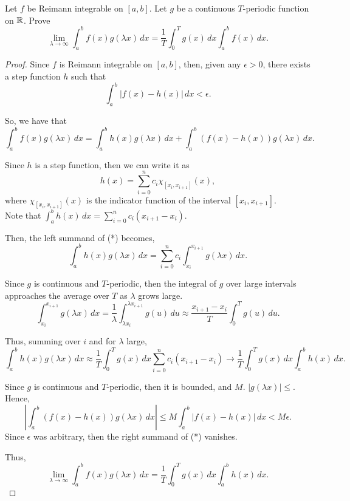 \documentclass[../hw5]{subfiles}
\begin{document}
\begin{problem}
Let $f$ be Reimann integrable on  $[a,b]$.
Let $g$ be a continuous  $T$-periodic function on  $\mathbb{R}$.
Prove \[
	\lim_{\lambda \to \infty} \int_{a}^{b} f(x)g(\lambda x) \,dx = \frac{1}{T}\int_{0}^{T}g(x)\,dx \int_{a}^{b} f(x) \,dx
	.\]
\end{problem}
\begin{proof}
	Since $f$ is Reimann integrable on $[a,b]$, then, given any  $\epsilon>0$, there exists a step function $h$ such that \[
		\int_{a}^{b} |f(x)-h(x)| \,dx < \epsilon
		.\]

	So, we have that \[
		\int_{a}^{b} f(x)g(\lambda x) \,dx = \int_{a}^{b} h(x)g(\lambda x) \,dx + \int_{a}^{b} (f(x)-h(x))g(\lambda x) \,dx \tag{*}
		.\]

	Since $h$ is a step function, then we can write it as \[
		h(x)=\sum_{i=0}^{n} c_i \chi_{[x_i,x_{i+1}]}(x)
		,\] where $ \chi_{[x_i,x_{i+1}]}(x)$ is the indicator function of the interval $[x_i,x_{i+1}]$.\\
	Note that $\int_{a}^{b} h(x) \,dx = \sum_{i=0}^{n} c_i (x_{i+1}-x_i)$.

	Then, the left summand of (*) becomes, \[
		\int_{a}^{b} h(x)g(\lambda x) \,dx = \sum_{i=0 }^{n} c_i \int_{x_i }^{x_{i+1}}g(\lambda x) \,dx
		.\]

	Since $g$ is continuous and $T$-periodic, then the integral of $g$ over large intervals approaches the average over $T$ as $\lambda$ grows large.
	\[
		\int_{x_i}^{x_{i+1}} g(\lambda x) \,dx
		= \frac{1}{\lambda}\int_{\lambda x_i}^{\lambda x_{i+1}} g(u) \,du
		\approx \frac{x_{i+1}-x_i}{T}\int_{0}^{T} g(u) \,du
		.\]

	Thus, summing over $i$ and for $\lambda$ large, \[
		\int_{a}^{b} h(x)g(\lambda x) \,dx
		\approx \frac{1}{T} \int_{0}^{T} g(x) \,dx \sum_{i=0}^{n} c_i (x_{i+1}-x_i)
		\to \frac{1}{T} \int_{0}^{T} g(x) \,dx \int_{a}^{b} h(x) \,dx
		.\]

	Since $g$ is continuous and $T$-periodic, then it is bounded, and $M$. $|g(\lambda x)|\le$.
	Hence, \[
		\left| \int_{a}^{b} (f(x)-h(x))g(\lambda x) \,dx \right| \le M \int_{a}^{b} |f(x)-h(x)| \,dx < M\epsilon
		.\] Since $\epsilon$ was arbitrary, then the right summand of (*) vanishes.

	Thus, \[
		\lim_{\lambda \to \infty} \int_{a}^{b} f(x)g(\lambda x) \,dx
		= \frac{1}{T} \int_{0}^{T} g(x) \,dx \int_{a}^{b} h(x) \,dx
		.\]
\end{proof}
\end{document}
